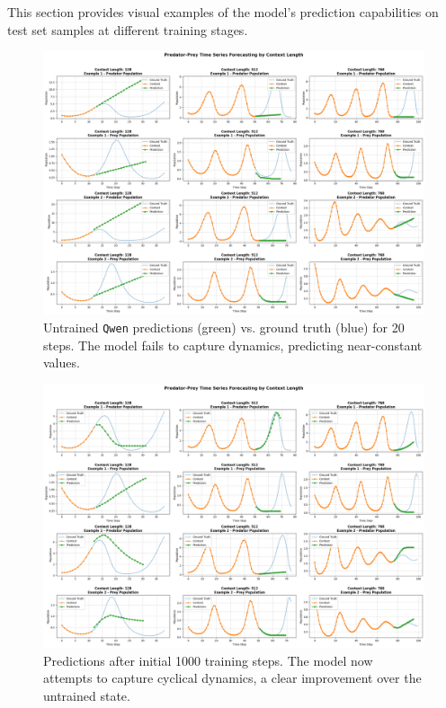 \documentclass{article}
\begin{document}
This section provides visual examples of the model's prediction capabilities on test set samples at different training stages.

\begin{figure}[!htbp]
    \centering
    \includegraphics[width=0.9\linewidth]{M2 Course Work//Images/untrained_performance.png}
    \caption{Untrained \texttt{Qwen} predictions (green) vs. ground truth (blue) for 20 steps. The model fails to capture dynamics, predicting near-constant values.} %
    \label{fig:untrained_predictions}
\end{figure}

\begin{figure}[!htbp]
    \centering
    \includegraphics[width=0.9\linewidth]{M2 Course Work//Images/intial_training_result.png}
    \caption{Predictions after initial 1000 training steps. The model now attempts to capture cyclical dynamics, a clear improvement over the untrained state.} %
    \label{fig:initial_training_predictions}
\end{figure}
\end{document}
